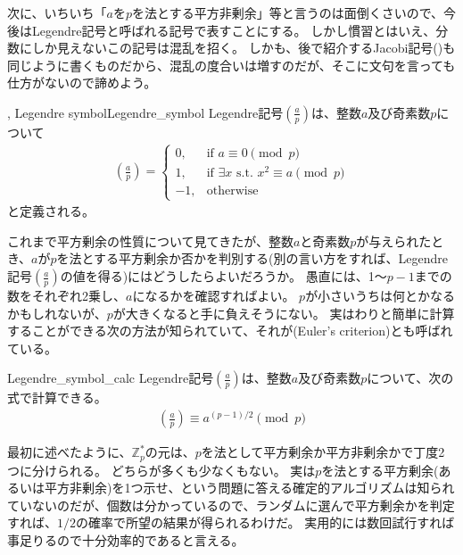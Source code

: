
次に、いちいち「$a$を$p$を法とする平方非剰余」等と言うのは面倒くさいので、今後はLegendre記号と呼ばれる記号で表すことにする。
しかし慣習とはいえ、分数にしか見えないこの記号は混乱を招く。
しかも、後で紹介するJacobi記号()も同じように書くものだから、混乱の度合いは増すのだが、そこに文句を言っても仕方がないので諦めよう。

\begin{Defi}{, Legendre symbol}{Legendre_symbol}
Legendre記号$\left(\frac{a}{p}\right)$は、整数$a$及び奇素数$p$について
\begin{align*}
\left(\frac{a}{p}\right) =
\begin{cases}
0, &\mbox{if }a \equiv 0 \pmod{p}\\
1, &\mbox{if }\exists x \mbox{ s.t. } x^2 \equiv a \pmod{p}\\
-1, &\mbox{otherwise}
\end{cases}
\end{align*}
と定義される。
\end{Defi}

これまで平方剰余の性質について見てきたが、整数$a$と奇素数$p$が与えられたとき、$a$が$p$を法とする平方剰余か否かを判別する(別の言い方をすれば、Legendre記号$\left(\frac{a}{p}\right)$の値を得る)にはどうしたらよいだろうか。
愚直には、1～$p-1$までの数をそれぞれ2乗し、$a$になるかを確認すればよい。
$p$が小さいうちは何とかなるかもしれないが、$p$が大きくなると手に負えそうにない。
実はわりと簡単に計算することができる次の方法が知られていて、それが(Euler's criterion)とも呼ばれている。

\begin{Prop}{}{Legendre_symbol_calc}
Legendre記号$\left(\frac{a}{p}\right)$は、整数$a$及び奇素数$p$について、次の式で計算できる。
\begin{align*}
\left(\frac{a}{p}\right) \equiv a^{(p-1)/2} \pmod{p}
\end{align*}
\end{Prop}


最初に述べたように、$\mathbb{Z}_p^*$の元は、$p$を法として平方剰余か平方非剰余かで丁度2つに分けられる。
どちらが多くも少なくもない。
実は$p$を法とする平方剰余(あるいは平方非剰余)を1つ示せ、という問題に答える確定的アルゴリズムは知られていないのだが、個数は分かっているので、ランダムに選んで平方剰余かを判定すれば、$1/2$の確率で所望の結果が得られるわけだ。
実用的には数回試行すれば事足りるので十分効率的であると言える。

